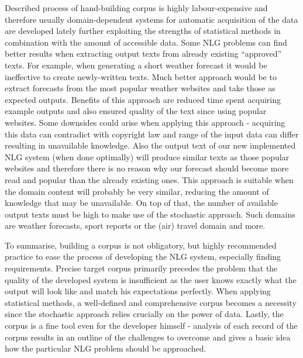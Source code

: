 Described process of hand-building corpus is highly labour-expensive and therefore usually domain-dependent systems for automatic acquisition of the data are developed lately further exploiting the strengths of statistical methods in combination with the amount of accessible data. Some NLG problems can find better results when extracting output texts from already existing “approved” texts. For example, when generating a short weather forecast it would be ineffective to create newly-written texts. Much better approach would be to extract forecasts from the most popular weather websites and take those as expected outputs. Benefits of this approach are reduced time spent acquiring example outputs and also ensured quality of the text since using popular websites. Some downsides could arise when applying this approach - acquiring this data can contradict with copyright law and range of the input data can differ resulting in unavailable knowledge. Also the output text of our new implemented NLG system (when done optimally) will produce similar texts as those popular websites and therefore there is no reason why our forecast should become more read and popular than the already existing ones. This approach is suitable when the domain content will probably be very similar, reducing the amount of knowledge that may be unavailable. On top of that, the number of available output texts must be high to make use of the stochastic approach. Such domains are weather forecasts, sport reports or the (air) travel domain and more.

To summarise, building a corpus is not obligatory, but highly recommended practice to ease the process of developing the NLG system, especially finding requirements. Precise target corpus primarily precedes the problem that the quality of the developed system is insufficient as the user knows exactly what the output will look like and match his expectations perfectly. When applying statistical methods, a well-defined and comprehensive corpus becomes a necessity since the stochastic approach relies crucially on the power of data. Lastly, the corpus is a fine tool even for the developer himself - analysis of each record of the corpus results in an outline of the challenges to overcome and gives a basic idea how the particular NLG problem should be approached.

